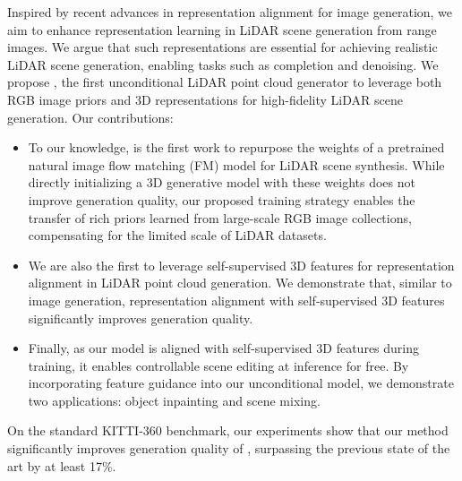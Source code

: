 Inspired by recent advances in representation alignment for image generation, we aim to enhance representation learning in LiDAR scene generation from range images. We argue that such representations are essential for achieving realistic LiDAR scene generation, enabling tasks such as completion and denoising. 
We propose \ours, the first unconditional LiDAR point cloud generator to leverage both RGB image priors and 3D representations for high-fidelity LiDAR scene generation.  Our contributions:
\begin{itemize}
    \item To our knowledge, \ours is the first work to repurpose the weights of a pretrained natural image flow matching (FM) model for LiDAR scene synthesis. While directly initializing a 3D generative model with these weights does not improve generation quality, our proposed training strategy enables the transfer of rich priors learned from large-scale RGB image collections, compensating for the limited scale of LiDAR datasets.    
    \item We are also the first to leverage self-supervised 3D features for representation alignment in LiDAR point cloud generation. We demonstrate that, similar to image generation, representation alignment with self-supervised 3D features significantly improves generation quality.
    \item Finally, as our model is aligned with self-supervised 3D features during training, it enables controllable scene editing at inference for free. By incorporating feature guidance into our unconditional model, we demonstrate two applications: object inpainting and scene mixing.
\end{itemize}
On the standard KITTI-360 benchmark, our experiments show that our method significantly improves generation quality of , surpassing the previous state of the art by at least 17\%. 

